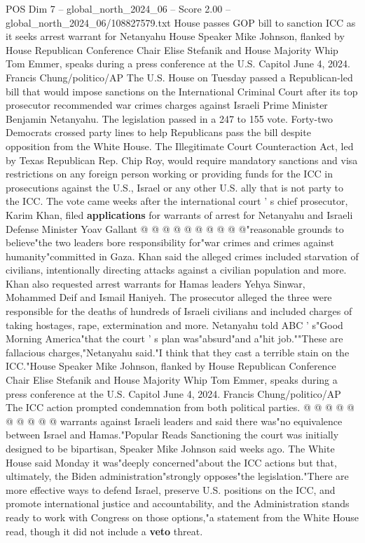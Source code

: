 \begin{textsample}{POS Dim 7 – global\_north\_2024\_06 – Score 2.00 – global\_north\_2024\_06/108827579.txt}  \label{ex:f7_pos_313}
House passes GOP bill to sanction ICC as it seeks arrest warrant for Netanyahu House Speaker Mike Johnson, flanked by House Republican Conference Chair Elise Stefanik and House Majority Whip Tom Emmer, speaks during a press conference at the U.S.
Capitol June 4, 2024.
Francis Chung/politico/AP The U.S.
House on Tuesday passed a Republican-led bill that would impose sanctions on the International Criminal Court after its top prosecutor recommended war crimes charges against Israeli Prime Minister Benjamin Netanyahu.
The legislation passed in a 247 to 155 vote.
Forty-two Democrats crossed party lines to help Republicans pass the bill despite opposition from the White House.
The Illegitimate Court Counteraction Act, led by Texas Republican Rep.
Chip Roy, would require mandatory sanctions and visa restrictions on any foreign person working or providing funds for the ICC in prosecutions against the U.S., Israel or any other U.S. ally that is not party to the ICC.
The vote came weeks after the international court ' s chief prosecutor, Karim Khan, filed \textbf{applications} for warrants of arrest for Netanyahu and Israeli Defense Minister Yoav Gallant @ @ @ @ @ @ @ @ @ @"reasonable grounds to believe"the two leaders bore responsibility for"war crimes and crimes against humanity"committed in Gaza.
Khan said the alleged crimes included starvation of civilians, intentionally directing attacks against a civilian population and more.
Khan also requested arrest warrants for Hamas leaders Yehya Sinwar, Mohammed Deif and Ismail Haniyeh.
The prosecutor alleged the three were responsible for the deaths of hundreds of Israeli civilians and included charges of taking hostages, rape, extermination and more.
Netanyahu told ABC ' s"Good Morning America"that the court ' s plan was"absurd"and a"hit job.""These are fallacious charges,"Netanyahu said."I think that they cast a terrible stain on the ICC."House Speaker Mike Johnson, flanked by House Republican Conference Chair Elise Stefanik and House Majority Whip Tom Emmer, speaks during a press conference at the U.S.
Capitol June 4, 2024.
Francis Chung/politico/AP The ICC action prompted condemnation from both political parties. @ @ @ @ @ @ @ @ @ @ warrants against Israeli leaders and said there was"no equivalence between Israel and Hamas."Popular Reads Sanctioning the court was initially designed to be bipartisan, Speaker Mike Johnson said weeks ago.
The White House said Monday it was"deeply concerned"about the ICC actions but that, ultimately, the Biden administration"strongly opposes"the legislation."There are more effective ways to defend Israel, preserve U.S. positions on the ICC, and promote international justice and accountability, and the Administration stands ready to work with Congress on those options,"a statement from the White House read, though it did not include a \textbf{veto} threat.

\end{textsample}
